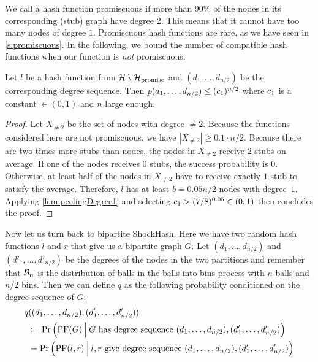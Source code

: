 \documentclass[a4paper,USenglish,cleveref]{lipics-v2021}
\def\cond{\hspace{0.8mm}\middle\vert\hspace{0.8mm}}
\begin{document}
We call a hash function promiscuous if more than 90\% of the nodes in its corresponding (stub) graph have degree 2.
This means that it cannot have too many nodes of degree $1$.
Promiscuous hash functions are rare, as we have seen in \cref{s:promiscuous}.
In the following, we bound the number of compatible hash functions when our function is \emph{not} promiscuous.

\begin{lemma}
  Let $l$ be a hash function from $\mathcal{H}\setminus\mathcal{H}_{\textrm{promisc}}$ and $(d_1, \ldots, d_{n/2})$ be the corresponding degree sequence.
  Then $p(d_1, \ldots, d_{n/2}) \leq (c_1)^{n/2}$ where $c_1$ is a constant $\in (0, 1)$ and $n$ large enough.
  \label{lem:nodeDegree1}
\end{lemma}
\begin{proof}
  Let $X_{\not=2}$ be the set of nodes with degree $\not=2$.
  Because the functions considered here are not promiscuous, we have $|X_{\not=2}| \geq 0.1 \cdot n/2$.
  Because there are two times more stubs than nodes, the nodes in $X_{\not=2}$ receive $2$ stubs on average.
  If one of the nodes receives $0$ stubs, the success probability is $0$.
  Otherwise, at least half of the nodes in $X_{\not=2}$ have to receive exactly $1$ stub to satisfy the average.
  Therefore, $l$ has at least $b=0.05n/2$ nodes with degree~$1$.
  Applying \cref{lem:peelingDegree1} and selecting $c_1 > (7/8)^{0.05} \in (0, 1)$ then concludes the proof.
\end{proof}

Now let us turn back to bipartite ShockHash.
Here we have two random hash functions $l$ and $r$ that give us a bipartite graph $G$.
Let $(d_1, \ldots, d_{n/2})$ and $(d'_1, \ldots, d'_{n/2})$ be the degrees of the nodes in the two partitions and remember that $\mathcal{B}_n$ is the distribution of balls in the balls-into-bins process with $n$ balls and $n/2$ bins.
Then we can define $q$ as the following probability conditioned on the degree sequence of $G$:
\begin{align*}
  q&((d_1, \ldots, d_{n/2}), (d'_1, \ldots, d'_{n/2}))\\
    &\coloneqq \Pr\left(\PF(G) \cond G \textrm{ has degree sequence } (d_1, \ldots, d_{n/2}), (d'_1, \ldots, d'_{n/2}) \right) \\
    &= \Pr\left(\PF(l, r) \cond l,r \textrm{ give degree sequence } (d_1, \ldots, d_{n/2}), (d'_1, \ldots, d'_{n/2}) \right)
\end{align*}
\end{document}
